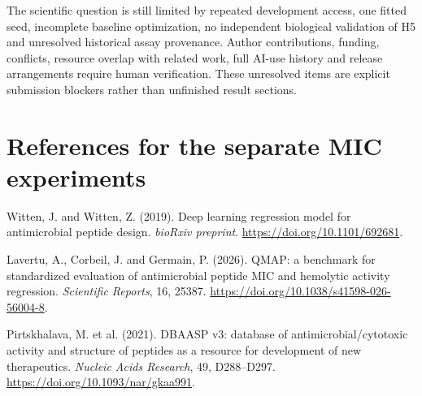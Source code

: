 \documentclass[12pt,a4paper]{article}
\begin{document}
The scientific question is still limited by repeated development access, one fitted seed, incomplete baseline optimization, no independent biological validation of H5 and unresolved historical assay provenance. Author contributions, funding, conflicts, resource overlap with related work, full AI-use history and release arrangements require human verification. These unresolved items are explicit submission blockers rather than unfinished result sections.
\section*{References for the separate MIC experiments}
\noindent Witten, J. and Witten, Z. (2019). Deep learning regression model for antimicrobial peptide design. \textit{bioRxiv preprint}. \url{https://doi.org/10.1101/692681}.

\noindent Lavertu, A., Corbeil, J. and Germain, P. (2026). QMAP: a benchmark for standardized evaluation of antimicrobial peptide MIC and hemolytic activity regression. \textit{Scientific Reports}, 16, 25387. \url{https://doi.org/10.1038/s41598-026-56004-8}.

\noindent Pirtskhalava, M. et al. (2021). DBAASP v3: database of antimicrobial/cytotoxic activity and structure of peptides as a resource for development of new therapeutics. \textit{Nucleic Acids Research}, 49, D288--D297. \url{https://doi.org/10.1093/nar/gkaa991}.
\end{document}
